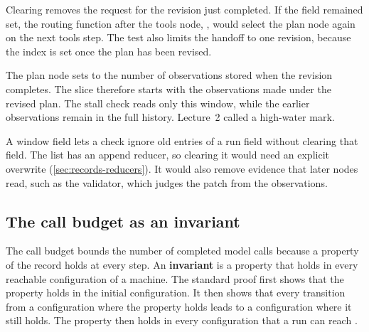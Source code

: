 Clearing  removes the request for the revision just completed. If the field
remained set, the routing function after the tools node, , would select the
plan node again on the next tools step. The test  also
limits the handoff to one revision, because the index is set once the plan has been revised.

The plan node sets  to the number of observations stored when the revision
completes. The slice  therefore starts with the observations
made under the revised plan. The stall check reads only this window, while the earlier observations
remain in the full history. Lecture~2 called  a high-water mark.

A window field lets a check ignore old entries of a run field without clearing that field. The list
 has an append reducer, so clearing it would need an explicit overwrite
(\cref{sec:records-reducers}). It would also remove evidence that later nodes read, such as the
validator, which judges the patch from the observations.

\subsection{The call budget as an invariant}
\label{sec:records-invariant}

The call budget bounds the number of completed model calls because a property of the record holds
at every step. An \textbf{invariant} is a property that holds in every reachable configuration of a
machine. The standard proof first shows that the property holds in the initial configuration. It
then shows that every transition from a configuration where the property holds leads to a
configuration where it still holds. The property then holds in every configuration that a run can
reach \citep[Theorem~2, p.~5]{mit6042-lec16}.

